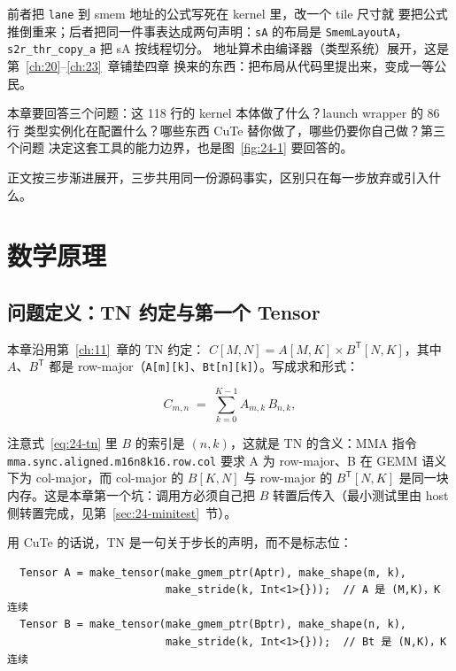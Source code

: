 前者把 \texttt{lane} 到 smem 地址的公式写死在 kernel 里，改一个 tile 尺寸就
要把公式推倒重来；后者把同一件事表达成两句声明：\texttt{sA} 的布局是
\texttt{SmemLayoutA}，\texttt{s2r\_\allowbreak{}thr\_\allowbreak{}copy\_\allowbreak{}a} 把 sA 按线程切分。
地址算术由编译器（类型系统）展开，这是第~\ref{ch:20}--\ref{ch:23}~章铺垫四章
换来的东西：把布局从代码里提出来，变成一等公民。

本章要回答三个问题：这 118 行的 kernel 本体做了什么？launch wrapper 的 86 行
类型实例化在配置什么？哪些东西 CuTe 替你做了，哪些仍要你自己做？第三个问题
决定这套工具的能力边界，也是图~\ref{fig:24-1} 要回答的。

正文按三步渐进展开，三步共用同一份源码事实，区别只在每一步放弃或引入什么。

\section{数学原理}

\subsection{问题定义：TN 约定与第一个 Tensor}

本章沿用第~\ref{ch:11}~章的 TN 约定：
$C[M,N] = A[M,K]\times B^{\mathsf T}[N,K]$，其中 $A$、$B^{\mathsf T}$ 都是
row-major（\texttt{A[m][k]}、\texttt{Bt[n][k]}）。写成求和形式：

\begin{equation}
  C_{m,n} \;=\; \sum_{k=0}^{K-1} A_{m,k}\, B_{n,k},
  \label{eq:24-tn}
\end{equation}

注意式~\eqref{eq:24-tn} 里 $B$ 的索引是 $(n,k)$，这就是 TN 的含义：MMA 指令
\texttt{mma.\allowbreak{}sync.\allowbreak{}aligned.\allowbreak{}m16n8k16.row.\allowbreak{}col} 要求 A 为 row-major、B 在 GEMM
语义下为 col-major，而 col-major 的 $B[K,N]$ 与 row-major 的
$B^{\mathsf T}[N,K]$ 是同一块内存。这是本章第一个坑：调用方必须自己把 $B$
转置后传入（最小测试里由 host 侧转置完成，见第~\ref{sec:24-minitest}~节）。

用 CuTe 的话说，TN 是一句关于步长的声明，而不是标志位：

\begin{lstlisting}
  Tensor A = make_tensor(make_gmem_ptr(Aptr), make_shape(m, k),
                         make_stride(k, Int<1>{}));  // A 是 (M,K)，K 连续
  Tensor B = make_tensor(make_gmem_ptr(Bptr), make_shape(n, k),
                         make_stride(k, Int<1>{}));  // Bt 是 (N,K)，K 连续
\end{lstlisting}

